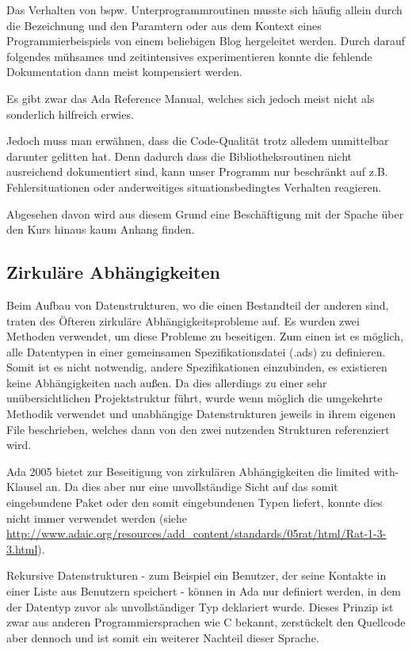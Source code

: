 \documentclass[12pt,a4paper,bibliography=totocnumbered,listof=totocnumbered]{scrartcl}
\begin{document}
Das Verhalten von bspw. Unterprogrammroutinen musste sich häufig allein durch die Bezeichnung und den Paramtern oder aus dem Kontext eines Programmierbeispiels von einem beliebigen Blog hergeleitet werden. Durch darauf folgendes mühsames und zeitintensives experimentieren konnte die fehlende Dokumentation dann meist kompensiert werden.

Es gibt zwar das Ada Reference Manual, welches sich jedoch meist nicht als sonderlich hilfreich erwies.

Jedoch muss man erwähnen, dass die Code-Qualität trotz alledem  unmittelbar darunter gelitten hat. Denn dadurch dass die Bibliotheksroutinen nicht ausreichend dokumentiert sind, kann unser Programm nur beschränkt auf z.B. Fehlersituationen oder anderweitiges situationsbedingtes Verhalten reagieren.

Abgesehen davon wird aus diesem Grund eine Beschäftigung mit der Spache über den Kurs hinaus kaum Anhang finden.

\subsection{Zirkuläre Abhängigkeiten}
Beim Aufbau von Datenstrukturen, wo die einen Bestandteil der anderen sind, traten des Öfteren zirkuläre Abhängigkeitsprobleme auf. Es wurden zwei Methoden verwendet, um diese Probleme zu beseitigen. Zum einen ist es möglich, alle Datentypen in einer gemeinsamen Spezifikationsdatei (.ads) zu definieren. Somit ist es nicht notwendig, andere Spezifikationen einzubinden, es existieren keine Abhängigkeiten nach außen. Da dies allerdings zu einer sehr unübersichtlichen Projektstruktur führt, wurde wenn möglich die umgekehrte Methodik verwendet und unabhängige Datenstrukturen jeweils in ihrem eigenen File beschrieben, welches dann von den zwei nutzenden Strukturen referenziert wird.

Ada 2005 bietet zur Beseitigung von zirkulären Abhängigkeiten die \glqq{}limited with\grqq{}-Klausel an. Da dies aber nur eine unvollständige Sicht auf das somit eingebundene Paket oder den somit eingebundenen Typen liefert, konnte dies nicht immer verwendet werden (siehe \url{http://www.adaic.org/resources/add_content/standards/05rat/html/Rat-1-3-3.html}).


Rekursive Datenstrukturen - zum Beispiel ein Benutzer, der seine Kontakte in einer Liste aus Benutzern speichert - können in Ada nur definiert werden, in dem der Datentyp zuvor als unvollständiger Typ deklariert wurde. Dieses Prinzip ist zwar aus anderen Programmiersprachen wie C bekannt, zerstückelt den Quellcode aber dennoch und ist somit ein weiterer Nachteil dieser Sprache.
\end{document}
